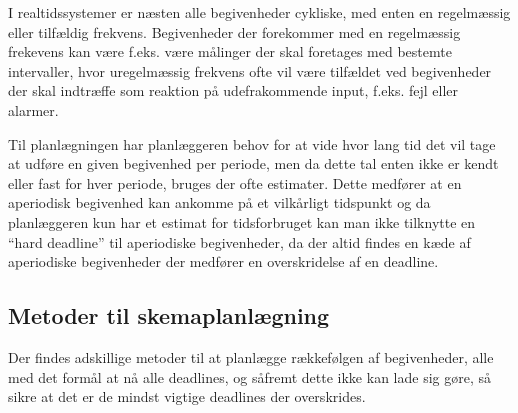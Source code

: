 I realtidssystemer er næsten alle begivenheder cykliske, med enten en regelmæssig eller tilfældig frekvens. Begivenheder der forekommer med en regelmæssig frekevens kan være f.eks. være målinger der skal foretages med bestemte intervaller, hvor uregelmæssig frekvens ofte vil være tilfældet ved begivenheder der skal indtræffe som reaktion på udefrakommende input, f.eks. fejl eller alarmer. 

\begin{shaded}
Til planlægningen har planlæggeren behov for at vide hvor lang tid det vil tage at udføre en given begivenhed per periode, men da dette tal enten ikke er kendt eller fast for hver periode, bruges der ofte estimater. Dette medfører at en aperiodisk begivenhed kan ankomme på et vilkårligt tidspunkt og da planlæggeren kun har et estimat for tidsforbruget kan man  ikke tilknytte en ``hard deadline'' til aperiodiske begivenheder, da der altid findes en kæde af aperiodiske begivenheder der medfører en overskridelse af en deadline. 
\end{shaded}


\subsection{Metoder til skemaplanlægning}
Der findes adskillige metoder til at planlægge rækkefølgen af begivenheder, alle med det formål at nå alle deadlines, og såfremt dette ikke kan lade sig gøre, så sikre at det er de mindst vigtige deadlines der overskrides. 

